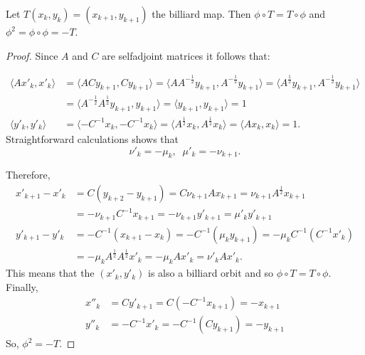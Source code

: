 \begin{proposition}
    \label{prop:veselov}
    Let $T(x_k,y_{k})=(x_{k+1},y_{k+1})$ the billiard map.
    Then $\phi\circ T=T\circ \phi$ and $\phi^2=\phi\circ\phi=-T.$
\end{proposition}
\begin{proof} Since $A $ and $C$ are selfadjoint matrices it follows that:
 
\begin{align*}
    \langle A x'_k,x'_k\rangle & =\langle A  Cy_{k+1},Cy_{k+1}\rangle= \langle A  A^{-\frac{1}{2} }y_{k+1},A^{-\frac{1}{2} }y_{k+1}\rangle=\langle A^{\frac{1}{2}  } y_{k+1},A^{-\frac{1}{2} } y_{k+1}\rangle\\
    &=\langle A^{-\frac{1}{2} }A^{ \frac{1}{2} } y_{k+1} ,  y_{k+1}\rangle=\langle y_{k+1} ,  y_{k+1}\rangle=1\\
   \langle y'_k,y'_k\rangle & = \langle -C^{-1}  x_{k},-C^{-1}x_{k}\rangle   = \langle A^{\frac{1}{2}}  x_{k },A^{\frac{1}{2} } x_{k }\rangle = \langle A   x_{k },  x_{k }\rangle=1.
\end{align*}
Straightforward calculations shows that
\[ \nu'_k=-\mu_k, \;\; \mu'_k=-\nu_{k+1}.\]

\noindent Therefore,
\begin{align*}
     x'_{k+1}-x'_k&=C(y_{k+2}-y_{k+1})=C\nu_{k+1}Ax_{k+1}=\nu_{k+1}A^{\frac{1}{2}}x_{k+1}\\
     &=-\nu_{k+1}C^{-1} x_{k+1} 
    = -\nu_{k+1} y'_{k+1}
     =\mu'_ky'_{k+1}\\ y'_{k+1}-y'_k&=-C^{-1}(x_{k+1}-x_k)=-C^{-1}(\mu_ky_{k+1})=-\mu_kC^{-1}(C^{-1} x'_k)\\
     &=-\mu_k A^{\frac{1}{2}}A^{\frac{1}{2}} x'_k=-\mu_kAx'_k=\nu'_kA x'_k. \end{align*}
This means that the $(x'_k,y'_k)$ is also a billiard orbit and so
 $\phi\circ T= T\circ \phi.$
Finally,
\begin{align*}
    x''_k&=Cy'_{k+1}=C(-C^{-1} x_{k+1})=-x_{k+1}\\
    y''_k&=-C^{-1}x'_k=-C^{-1}(Cy_{k+1})=-y_{k+1}
\end{align*}
So, $\phi^2=-T.$
\end{proof}
